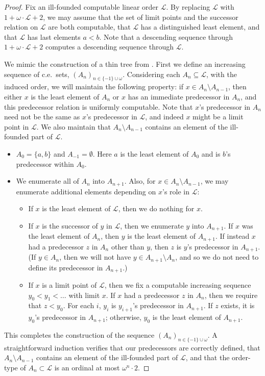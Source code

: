 \documentclass{amsart}
\newcommand\+[1]{\mathcal{#1}}
\renewcommand\*[1]{\mathbf{#1}}
\renewcommand\=[1]{\text{#1}}
\renewcommand\*[1]{\mathbf{#1}}
\begin{document}
\begin{proof}
Fix an ill-founded computable linear order $\+L$.  By replacing $\+L$ with $1+\omega\cdot \+L+2$, we may assume that the set of limit points and the successor relation on $\+L$ are both computable, that $\+L$ has a distinguished least element, and that $\+L$ has last elements $a < b$.  Note that a descending sequence through $1+\omega\cdot \+L+2$ computes a descending sequence through $\+L$.

We mimic the construction of a thin tree from \cite{km2010}.  First we define an increasing sequence of c.e.\ sets, $(A_n)_{n \in \{-1\} \cup \omega}$.  Considering each $A_n \subseteq \+L$, with the induced order, we will maintain the following property: if $x \in A_n \setminus A_{n-1}$, then either $x$ is the least element of $A_n$ or $x$ has an immediate predecessor in $A_n$, and this predecessor relation is uniformly computable.  Note that $x$'s predecessor in $A_n$ need not be the same as $x$'s predecessor in $\+L$, and indeed $x$ might be a limit point in $\+L$.  We also maintain that $A_n \setminus A_{n-1}$ contains an element of the ill-founded part of $\+L$.
\begin{itemize}
\item $A_0 = \{a, b\}$ and $A_{-1} = \emptyset$.  Here $a$ is the least element of $A_0$ and is $b$'s predecessor within $A_0$.
\item We enumerate all of $A_n$ into $A_{n+1}$.  Also, for $x \in A_n \setminus A_{n-1}$, we may enumerate additional elements depending on $x$'s role in $\+L$:
\begin{itemize}
\item If $x$ is the least element of $\+L$, then we do nothing for $x$.
\item If $x$ is the successor of $y$ in $\+L$, then we enumerate $y$ into $A_{n+1}$.  If $x$ was the least element of $A_n$, then $y$ is the least element of $A_{n+1}$.  If instead $x$ had a predecessor $z$ in $A_n$ other than $y$, then $z$ is $y$'s predecessor in $A_{n+1}$.  (If $y \in A_n$, then we will not have $y \in A_{n+1}\setminus A_n$, and so we do not need to define its predecessor in $A_{n+1}$.)
\item If $x$ is a limit point of $\+L$, then we fix a computable increasing sequence $y_0 < y_1 < \dots$ with limit $x$.  If $x$ had a predecessor $z$ in $A_n$, then we require that $z < y_0$.  For each $i$, $y_i$ is $y_{i+1}$'s predecessor in $A_{n+1}$.  If $z$ exists, it is $y_0$'s predecessor in $A_{n+1}$; otherwise, $y_0$ is the least element of $A_{n+1}$.
\end{itemize}
\end{itemize}
This completes the construction of the sequence $(A_n)_{n \in \{-1\}\cup\omega}$.  A straightforward induction verifies that our predecessors are correctly defined, that $A_n\setminus A_{n-1}$ contains an element of the ill-founded part of $\+L$, and that the order-type of $A_n \subset \+L$ is an ordinal at most $\omega^n\cdot 2$.


\end{proof}
\end{document}
